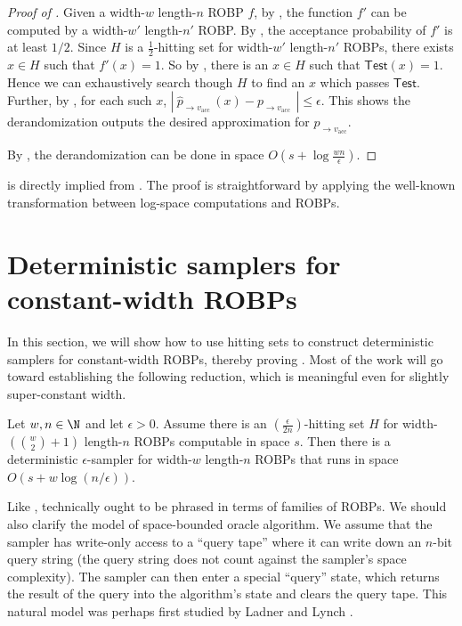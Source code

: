 \begin{proof}[Proof of ] 
Given a width-$w$ length-$n$ ROBP $f$, by , the function $f'$ can be computed by  a width-$w' $ length-$n' $ ROBP. By , the acceptance probability of $f'$ is at least $1/2$. Since $H$ is a $\frac{1}{2}$-hitting set for width-$w'$ length-$n'$ ROBPs, there exists $x\in H$ such that $f'(x) = 1$. So by , there is an $x\in H$ such that $\mathsf{Test}(x) = 1$. Hence we can  exhaustively search though $H$ to find an $x$ which passes $\mathsf{Test}$. Further, by , for each such $x$, $ |\: \widehat{p}_{ \to v_{\text{acc }} }(x)  - p_{ \to v_{\text{acc }} } \:| \leq \epsilon$. This shows the derandomization  outputs the desired approximation for $p_{ \to v_{\text{acc}} }$.

By , the derandomization can be done in space  $O(s+\log \frac{wn}{\epsilon})$.
\end{proof}

 is directly implied from . The proof is  straightforward by applying the %
well-known %
transformation between %
log-space %
computations and ROBPs.

\section{Deterministic samplers for constant-width ROBPs} \label{sec:constwidth}

In this section, we will show how to use hitting sets to construct deterministic samplers for constant-width ROBPs, thereby proving . Most of the work will go toward establishing the following reduction, which is meaningful even for slightly super-constant width.

\begin{theorem} \label{thm:const-width-reduction}
Let $w, n \in \N$ and let $\epsilon > 0$. Assume there is an $(\frac{\epsilon}{2n})$-hitting set $H$ for width-$(\binom{w}{2} + 1)$ length-$n$ ROBPs computable in space $s$. Then there is a deterministic $\epsilon$-sampler for width-$w$ length-$n$ ROBPs that runs in space $O(s + w \log(n/\epsilon))$.
\end{theorem}

Like ,  technically ought to be phrased in terms of families of ROBPs. We should also clarify the model of space-bounded oracle algorithm. We assume that the sampler has write-only access to a ``query tape'' where it can write down an $n$-bit query string (the query string does not count against the sampler's space complexity). The sampler can then enter a special ``query'' state, which returns the result of the query into the algorithm's state and clears the query tape. This natural model was perhaps first studied by Ladner and Lynch \cite{LL76}.

